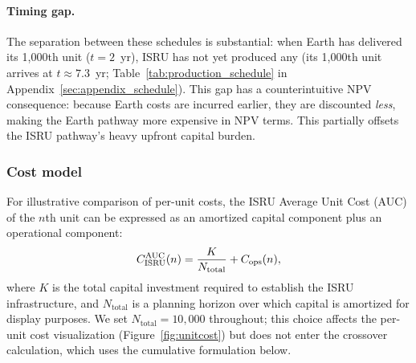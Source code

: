 \documentclass[5p,twocolumn]{elsarticle}
\begin{document}
\paragraph{Timing gap.} The separation between these schedules is substantial: when Earth has delivered its 1{,}000th unit ($t = 2$~yr), ISRU has not yet produced any (its 1{,}000th unit arrives at $t \approx 7.3$~yr; Table~\ref{tab:production_schedule} in Appendix~\ref{sec:appendix_schedule}). This gap has a counterintuitive NPV consequence: because Earth costs are incurred earlier, they are discounted \emph{less}, making the Earth pathway more expensive in NPV terms. This partially offsets the ISRU pathway's heavy upfront capital burden.

\subsubsection{Cost model}

For illustrative comparison of per-unit costs, the ISRU Average Unit Cost (AUC) of the $n$th unit can be expressed as an amortized capital component plus an operational component:
\begin{equation}\small
  C_{\mathrm{ISRU}}^{\mathrm{AUC}}(n) = \frac{K}{N_{\mathrm{total}}} + C_{\mathrm{ops}}(n),
  \label{eq:isru_unit}
\end{equation}
where $K$ is the total capital investment required to establish the ISRU infrastructure, and $N_{\mathrm{total}}$ is a planning horizon over which capital is amortized for display purposes. We set $N_{\mathrm{total}} = 10{,}000$ throughout; this choice affects the per-unit cost visualization (Figure~\ref{fig:unitcost}) but does not enter the crossover calculation, which uses the cumulative formulation below.
\end{document}
